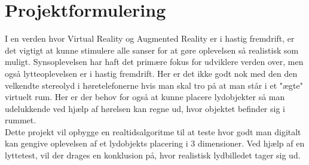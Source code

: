 \chapter{Projektformulering}

I en verden hvor Virtual Reality og Augmented Reality er i hastig fremdrift, er det vigtigt at kunne stimulere alle sanser for at gøre oplevelsen så realistisk som muligt. Synsoplevelsen har haft det primære fokus for udviklere verden over, men også lytteoplevelsen er i hastig fremdrift. Her er det ikke godt nok med den den velkendte stereolyd i høretelefonerne hvis man skal tro på at man står i et "ægte" virtuelt rum. Her er der behov for også at kunne placere lydobjekter så man udelukkende ved hjælp af hørelsen kan regne ud, hvor objektet befinder sig i rummet.\\ Dette projekt vil opbygge en realtidsalgoritme til at teste hvor godt man digitalt kan gengive oplevelsen af et lydobjekts placering i 3 dimensioner. Ved hjælp af en lyttetest, vil der drages en konklusion på, hvor realistisk lydbilledet tager sig ud.


